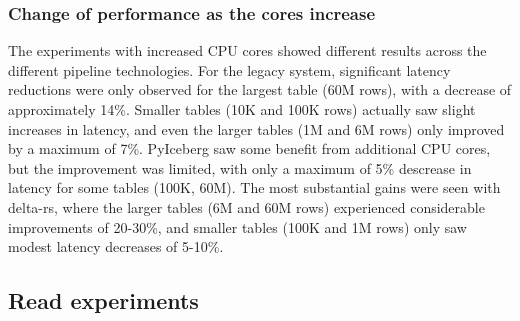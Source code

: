\subsubsection*{Change of performance as the  cores increase}
The experiments with increased \gls{CPU} cores showed different results across the different pipeline technologies.  For the legacy system, significant latency reductions were only observed for the largest table (60M rows), with a decrease of approximately 14\%. Smaller tables (10K and 100K rows) actually saw slight increases in latency, and even the larger tables (1M and 6M rows) only improved by a maximum of 7\%. 
PyIceberg saw some benefit from additional \gls{CPU} cores, but the improvement was limited, with only a maximum of 5\% descrease in latency for some tables (100K, 60M). 
The most substantial gains were seen with delta-rs, where the larger tables (6M and 60M rows) experienced considerable improvements of 20-30\%, and smaller tables (100K and 1M rows) only saw modest latency decreases of 5-10\%.



\subsection{Read experiments}

